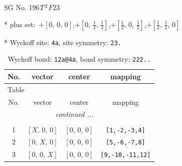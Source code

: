 \documentclass[fleqn,8pt]{jsarticle}
\begin{document}
\setcounter{MaxMatrixCols}{32}

\renewcommand{\tablename}{Table~}
\renewcommand{\figurename}{Figure~}
\begin{center}
\LARGE
SG No. 196\quad$T_{\rm }^{2}$\quad$F23$\quad[ cubic ]
\end{center}

* plus set:\,\,\,$+\left[ 0,\, 0,\, 0 \right]$,\quad $+\left[ 0,\, \frac{1}{2},\, \frac{1}{2} \right]$,\quad $+\left[ \frac{1}{2},\, 0,\, \frac{1}{2} \right]$,\quad $+\left[ \frac{1}{2},\, \frac{1}{2},\, 0 \right]$


* Wyckoff site: {\tt 4a}, site symmetry: {\tt 23.}
\renewcommand{\arraystretch}{1.2}
\begin{longtable}{cccc}
\caption{Wyckoff bond: {\tt 12a@4a}, bond symmetry: {\tt 222..}}
 \\
 \hline \hline
No. & vector & center & mapping \\ \hline \endfirsthead

\multicolumn{3}{l}{\tablename\ \thetable{}} \\
 \hline \hline
No. & vector & center & mapping \\ \hline \endhead

 \hline \hline
\multicolumn{3}{r}{\footnotesize\it continued ...} \\ \endfoot

 \hline \hline
\multicolumn{3}{r}{} \\ \endlastfoot

1 & $\left[ X,\, 0,\, 0 \right]$ & $\left[ 0,\, 0,\, 0 \right]$ & {\tt [1,-2,-3,4]} \\ \hline
2 & $\left[ 0,\, X,\, 0 \right]$ & $\left[ 0,\, 0,\, 0 \right]$ & {\tt [5,-6,-7,8]} \\ \hline
3 & $\left[ 0,\, 0,\, X \right]$ & $\left[ 0,\, 0,\, 0 \right]$ & {\tt [9,-10,-11,12]} \\
\end{longtable}
\renewcommand{\arraystretch}{1.2}
\end{document}
